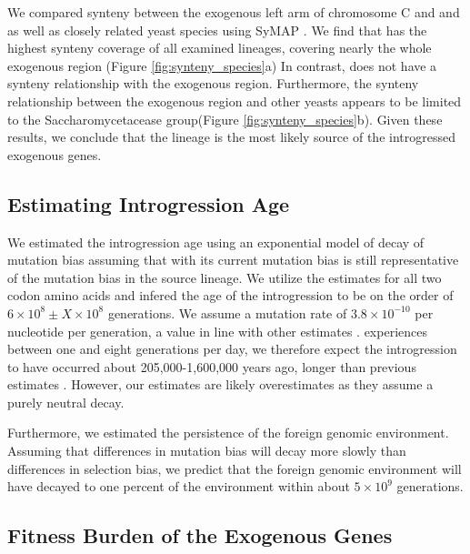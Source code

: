 \documentclass[12pt]{article}
\begin{document}
We compared synteny between the exogenous left arm of chromosome C and \gossypii and \dubl as well as closely related yeast species using SyMAP \citep{soderlund2006, soderlund2011}.
We find that \gossypii has the highest synteny coverage of all examined lineages, covering nearly the whole exogenous region (Figure \ref{fig:synteny_species}a)
In contrast, \dubl does not have a synteny relationship with the exogenous region.
Furthermore, the synteny relationship between the exogenous region and other yeasts appears to be limited to the Saccharomycetacease group(Figure \ref{fig:synteny_species}b).
Given these results, we conclude that the \gossypii lineage is the most likely source of the introgressed exogenous genes.

\subsection*{Estimating Introgression Age}

We estimated the introgression age using an exponential model of decay of mutation bias assuming that \gossypii with its current mutation bias is still representative of the mutation bias in the source lineage.
We utilize the \DM estimates for all two codon amino acids and infered the age of the introgression to be on the order of $6\times 10^8 \pm X\times 10^8$ generations. 
We assume a mutation rate of $3.8\times 10^{-10}$ per nucleotide per generation, a value in line with other estimates \citep{zhu2014, lang2008}.
\kluyveri experiences between one and eight generations per day, we therefore expect the introgression to have occurred about 205,000-1,600,000 years ago, longer than previous estimates \citep{friedrich2015}.
However, our estimates are likely overestimates as they assume a purely neutral decay.

Furthermore, we estimated the persistence of the foreign genomic environment.
Assuming that differences in mutation bias will decay more slowly than differences in selection bias, we predict that the foreign genomic environment will have decayed to one percent of the \kluyveri environment within about $5\times 10^9$ generations.


\subsection*{Fitness Burden of the Exogenous Genes}
\end{document}
